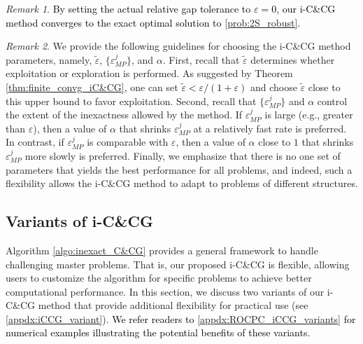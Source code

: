 \documentclass[preprint,review,11pt]{elsarticle}
\theoremstyle{definition}
\theoremstyle{remark}
\newtheorem{rem}{Remark}
\newcommand{\epst}{\widetilde{\varepsilon}}
\newcommand{\blue}{\textcolor{black}}
\begin{document}
\begin{rem}
\blue{By setting the actual relative gap tolerance to $\varepsilon=0$, our i-C\&CG method converges to the exact optimal solution to \eqref{prob:2S_robust}.}
\end{rem}

\begin{rem}
We provide the following guidelines for choosing the i-C\&CG method parameters, namely, $\epst$, $\{\varepsilon_{MP}^j\}$, and $\alpha$.  First, recall that $\epst$ determines whether exploitation or exploration is performed. As suggested by Theorem \ref{thm:finite_convg_iC&CG}, one can set \blue{$\epst<\varepsilon/(1+\varepsilon)$} and choose $\epst$ close to this upper bound to favor exploitation. Second, recall that $\{\varepsilon_{MP}^j\}$ and $\alpha$ control the extent of the inexactness allowed by the method. If $\varepsilon_{MP}^j$ is large (e.g., greater than $\varepsilon$), then a value of $\alpha$ that shrinks $\varepsilon_{MP}^j$ at a relatively fast rate is preferred.  In contrast, if $\varepsilon_{MP}^j$ is comparable with $\varepsilon$, then a value of $\alpha$ close to $1$ that shrinks $\varepsilon_{MP}^j$ more slowly is preferred. Finally, we emphasize that there is no one set of parameters that yields the best performance for all problems, and indeed, such a flexibility allows the i-C\&CG method to adapt to problems of different structures.
\end{rem}


\subsection{Variants of i-C\&CG} \label{subsec:inexact_C&CG_variant}

Algorithm \ref{algo:inexact_C&CG} provides a general framework to handle challenging master problems. That is, our proposed i-C\&CG is flexible, allowing users to customize the algorithm for specific problems to achieve better computational performance. In this section, we discuss two variants of our i-C\&CG method that provide additional flexibility for practical use (see \ref{appdx:iCCG_variant}). \blue{We refer readers to \ref{appdx:ROCPC_iCCG_variants} for numerical examples illustrating the potential benefits of these variants. }
\end{document}
